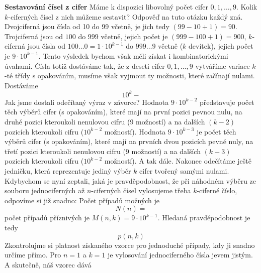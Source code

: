\wikitextrule
\begin{example}\label{mai:exam052}
  \textbf{Sestavování čísel z cifer}\newline\small
   Máme k dispozici libovolný počet cifer \(0, 1, \ldots, 9\). Kolik \(k\)-ciferných čísel z nich 
   můžeme sestavit? Odpověď na tuto otázku každý zná. Dvojciferná jsou čísla od \num{10} do 
   \num{99} včetně, je jich tedy \((99 - 10 + 1) = 90\). Trojciferná jsou od \(100\) do \(999\) 
   včetně, jejich počet je \((999 - 100 + 1) = 900\), \(k\)-ciferná jsou čísla od \(100\ldots0 = 
   1\cdot10^{k-1}\) do \(999\ldots9\) včetně (\(k\) devítek), jejich počet je \(9\cdot10^{k-1}\). 
   Tento výsledek bychom však měli získat i kombinatorickými úvahami. Čísla totiž dostáváme tak, že 
   z deseti cifer \(0, 1,\ldots, 9\) vytváříme variace \(k\)-té třídy s opakováním, musíme však 
   vyjmout ty možnosti, které začínají nulami. Dostáváme
   \begin{equation*}
     10^k - 
   \end{equation*}
   Jak jsme dostali odečítaný výraz v závorce? Hodnota \(9\cdot10^{k-2}\) představuje počet těch 
   výběrů cifer (s opakováním), které mají na první pozici pevnou nulu, na druhé pozici kteroukoli 
   nenulovou cifru (\num{9} možností) a na dalších \((k - 2)\) pozicích kteroukoli cifru 
   (\(10^{k-2}\) možností). Hodnota \(9\cdot10^{k-3}\) je počet těch výběrů cifer (s opakováním), 
   které mají na prvních dvou pozicích pevné nuly, na třetí pozici kteroukoli nenulovou cifru 
   (\num{9} možností) a na dalších \((k - 3)\) pozicích kteroukoli cifru (\(10^{k-2}\) možností). A 
   tak dále. Nakonec odečítáme ještě jedničku, která reprezentuje jediný výběr \(k\) cifer tvořený 
   samými nulami. Kdybychom se nyní zeptali, jaká je pravděpodobnost, že při náhodném výběru ze 
   souboru jednociferných až \(n\)-ciferných čísel vylosujeme třeba \(k\)-ciferné číslo, odpovíme 
   si již snadno: Počet případů možných je
   \begin{equation*}
     N(n) =
   \end{equation*}
   počet případů příznivých je  \(M(n,k) = 9\cdot10^{k-1}\). Hledaná pravděpodobnost je tedy
   \begin{equation*}
     p(n,k)
   \end{equation*}
   Zkontrolujme si platnost získaného vzorce pro jednoduché případy, kdy ji snadno určíme přímo. 
   Pro \(n = 1\) a \(k = 1\) je vylosování jednociferného čísla jevem jistým. A skutečně, náš 
   vzorec dává
  \normalsize
\end{example}
